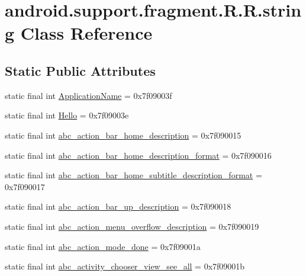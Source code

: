 \hypertarget{classandroid_1_1support_1_1fragment_1_1_r_1_1string}{
\section{android.support.fragment.R.R.string Class Reference}
\label{classandroid_1_1support_1_1fragment_1_1_r_1_1string}
}
\subsection*{Static Public Attributes}
\begin{CompactItemize}
\item 
static final int \hyperlink{classandroid_1_1support_1_1fragment_1_1_r_1_1string_dd98d5d499bd4e73f395dd93871ac43b}{ApplicationName} = 0x7f09003f
\item 
static final int \hyperlink{classandroid_1_1support_1_1fragment_1_1_r_1_1string_0b9fc8aca199d44f7517337f141036ba}{Hello} = 0x7f09003e
\item 
static final int \hyperlink{classandroid_1_1support_1_1fragment_1_1_r_1_1string_50d54bb6cd3ba64c565846c9b0fc9546}{abc\_\-action\_\-bar\_\-home\_\-description} = 0x7f090015
\item 
static final int \hyperlink{classandroid_1_1support_1_1fragment_1_1_r_1_1string_35891127afde5148fc5ff7b6e88aa026}{abc\_\-action\_\-bar\_\-home\_\-description\_\-format} = 0x7f090016
\item 
static final int \hyperlink{classandroid_1_1support_1_1fragment_1_1_r_1_1string_bb556da1231c39c187597fbb53ac4a86}{abc\_\-action\_\-bar\_\-home\_\-subtitle\_\-description\_\-format} = 0x7f090017
\item 
static final int \hyperlink{classandroid_1_1support_1_1fragment_1_1_r_1_1string_9ccc4eccb72384b17a7fd9da838ba08d}{abc\_\-action\_\-bar\_\-up\_\-description} = 0x7f090018
\item 
static final int \hyperlink{classandroid_1_1support_1_1fragment_1_1_r_1_1string_d225f5d152bb0768be6c4af480e6896a}{abc\_\-action\_\-menu\_\-overflow\_\-description} = 0x7f090019
\item 
static final int \hyperlink{classandroid_1_1support_1_1fragment_1_1_r_1_1string_898b300053ca3b78b4c90b1cbceb7804}{abc\_\-action\_\-mode\_\-done} = 0x7f09001a
\item 
static final int \hyperlink{classandroid_1_1support_1_1fragment_1_1_r_1_1string_44c25a350c784b7249a7e344394479fc}{abc\_\-activity\_\-chooser\_\-view\_\-see\_\-all} = 0x7f09001b

\end{CompactItemize}
